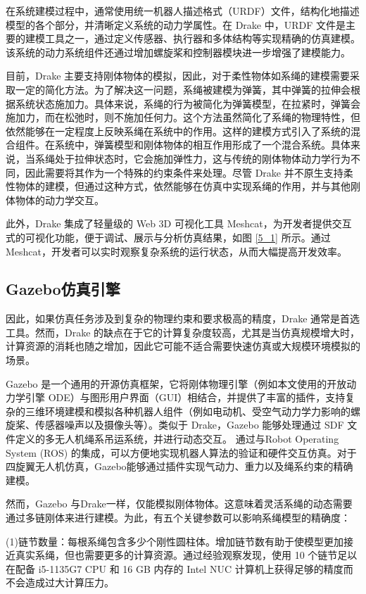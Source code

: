 \documentclass[lang=chs, degree=master, blindreview=true, winfonts=true]{yanputhesis}
\begin{document}
在系统建模过程中，通常使用统一机器人描述格式（URDF）文件，结构化地描述模型的各个部分，并清晰定义系统的动力学属性。在 Drake 中，URDF 文件是主要的建模工具之一，通过定义传感器、执行器和多体结构等实现精确的仿真建模。该系统的动力系统组件还通过增加螺旋桨和控制器模块进一步增强了建模能力。

目前，Drake 主要支持刚体物体的模拟，因此，对于柔性物体如系绳的建模需要采取一定的简化方法。为了解决这一问题，系绳被建模为弹簧，其中弹簧的拉伸会根据系统状态施加力。具体来说，系绳的行为被简化为弹簧模型，在拉紧时，弹簧会施加力，而在松弛时，则不施加任何力。这个方法虽然简化了系绳的物理特性，但依然能够在一定程度上反映系绳在系统中的作用。这样的建模方式引入了系统的混合组件。在系统中，弹簧模型和刚体物体的相互作用形成了一个混合系统。具体来说，当系绳处于拉伸状态时，它会施加弹性力，这与传统的刚体物体动力学行为不同，因此需要将其作为一个特殊的约束条件来处理。尽管 Drake 并不原生支持柔性物体的建模，但通过这种方式，依然能够在仿真中实现系绳的作用，并与其他刚体物体的动力学交互。

此外，Drake 集成了轻量级的 Web 3D 可视化工具 Meshcat，为开发者提供交互式的可视化功能，便于调试、展示与分析仿真结果，如图 \ref{5_1} 所示。通过 Meshcat，开发者可以实时观察复杂系统的运行状态，从而大幅提高开发效率。

\subsection{Gazebo仿真引擎}

因此，如果仿真任务涉及到复杂的物理约束和要求极高的精度，Drake 通常是首选工具。然而，Drake 的缺点在于它的计算复杂度较高，尤其是当仿真规模增大时，计算资源的消耗也随之增加，因此它可能不适合需要快速仿真或大规模环境模拟的场景。

Gazebo 是一个通用的开源仿真框架，它将刚体物理引擎（例如本文使用的开放动力学引擎 ODE）与图形用户界面（GUI）相结合，并提供了丰富的插件，支持复杂的三维环境建模和模拟各种机器人组件（例如电动机、受空气动力学力影响的螺旋桨、传感器噪声以及摄像头等）。类似于 Drake，Gazebo 能够处理通过 SDF 文件定义的多无人机绳系吊运系统，并进行动态交互。
通过与Robot Operating System (ROS) 的集成，可以方便地实现机器人算法的验证和硬件交互仿真。对于四旋翼无人机仿真，Gazebo能够通过插件实现气动力、重力以及绳系约束的精确建模。

然而，Gazebo 与Drake一样，仅能模拟刚体物体。这意味着灵活系绳的动态需要通过多链刚体来进行建模。为此，有五个关键参数可以影响系绳模型的精确度：

(1){链节数量}：每根系绳包含多少个刚性圆柱体。增加链节数有助于使模型更加接近真实系绳，但也需要更多的计算资源。通过经验观察发现，使用 10 个链节足以在配备 i5-1135G7 CPU 和 16 GB 内存的 Intel NUC 计算机上获得足够的精度而不会造成过大计算压力。
    
\end{document}
